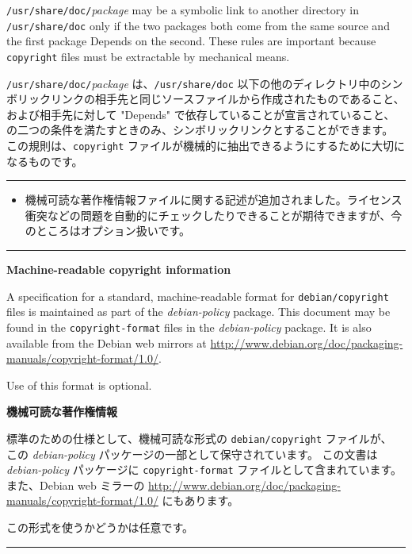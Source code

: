 \documentclass[mingoth,a4paper]{jsarticle}
\begin{document}
\par
\parbox{0.48\linewidth}{
	  {\tt /usr/share/doc/}{\it package} may be a symbolic
	  link to another directory in {\tt /usr/share/doc} only if
	  the two packages both come from the same source and the
	  first package Depends on the second.  These rules are important
	  because {\tt copyright} files must be extractable by
	  mechanical means.
}\hfil 
\parbox{0.48\linewidth}{
	  {\tt/usr/share/doc/}{\it package}
	  は、{\tt /usr/share/doc}
	  以下の他のディレクトリ中のシンボリックリンクの相手先と同じソースファイルから作成されたものであること、および相手先に対して
	  "Depends" で依存していることが宣言されていること、の二つの条件を満たすときのみ、シンボリックリンクとすることができます。
	  この規則は、{\tt copyright} ファイルが機械的に抽出できるようにするために大切になるものです。
}
\hrule
\vspace{1ex}

\begin{itemize}
\item 機械可読な著作権情報ファイルに関する記述が追加されました。ライセンス衝突などの問題を自動的にチェックしたりできることが期待できますが、今のところはオプション扱いです。
\end{itemize}

\vspace{1ex}
\hrule
{}\par
\parbox{0.48\linewidth}{
	  {\bf Machine-readable copyright information}

	    A specification for a standard, machine-readable format
	    for {\tt debian/copyright} files is maintained as part
	    of the {\it debian-policy} package.  This
	    document may be found in the {\tt copyright-format}
	    files in the {\it debian-policy} package.  It is
	    also available from the Debian web mirrors at
		     \url{http://www.debian.org/doc/packaging-manuals/copyright-format/1.0/}.

	    Use of this format is optional.
}\hfil 
\parbox{0.48\linewidth}{
	  {\bf 機械可読な著作権情報}

	    標準のための仕様として、機械可読な形式の
	    {\tt debian/copyright} ファイルが、
	    この {\it debian-policy} パッケージの一部として保守されています。
	    この文書は {\it debian-policy} パッケージに
	    {\tt copyright-format} ファイルとして含まれています。
	    また、Debian web ミラーの
		     \url{http://www.debian.org/doc/packaging-manuals/copyright-format/1.0/} にもあります。

	    この形式を使うかどうかは任意です。
}
\hrule
\vspace{1ex}
\end{document}
